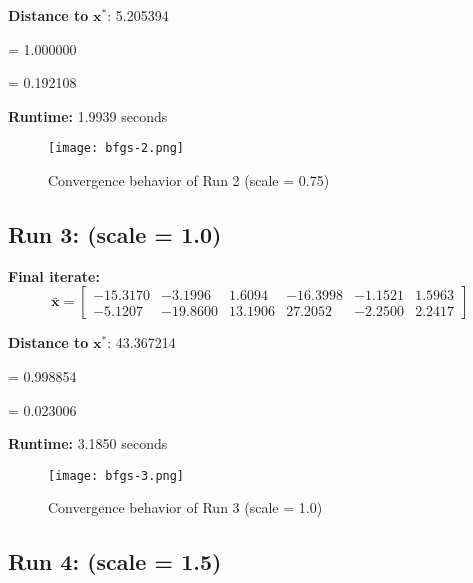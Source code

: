\documentclass{article}
\begin{document}
\vspace{0.5em}
\noindent
\textbf{Distance to } $\mathbf{x}^*$: 5.205394

\vspace{0.5em}
\noindent
{} = 1.000000

\noindent
{} = 0.192108

\vspace{0.5em}
\noindent
\textbf{Runtime:} 1.9939 seconds

\begin{figure}[H]
    \centering
    \texttt{[image: bfgs-2.png]}
    \caption{Convergence behavior of Run 2 (scale = 0.75)}
    \label{fig:run2}
\end{figure}



\subsection*{Run 3: (scale = 1.0)}
\vspace{1em}

\textbf{Final iterate:}
\[
\bar{\mathbf{x}} =
\begin{bmatrix}
-15.3170 & -3.1996 & 1.6094 & -16.3998 & -1.1521 & 1.5963 \\
-5.1207 & -19.8600 & 13.1906 & 27.2052 & -2.2500 & 2.2417
\end{bmatrix}
\]

\vspace{0.5em}
\noindent
\textbf{Distance to } $\mathbf{x}^*$: 43.367214

\vspace{0.5em}
\noindent
{} = 0.998854

\noindent
{} = 0.023006

\vspace{0.5em}
\noindent
\textbf{Runtime:} 3.1850 seconds

\begin{figure}[H]
    \centering
    \texttt{[image: bfgs-3.png]}
    \caption{Convergence behavior of Run 3 (scale = 1.0)}
    \label{fig:run3}
\end{figure}



\subsection*{Run 4: (scale = 1.5)}
\vspace{1em}
\end{document}
